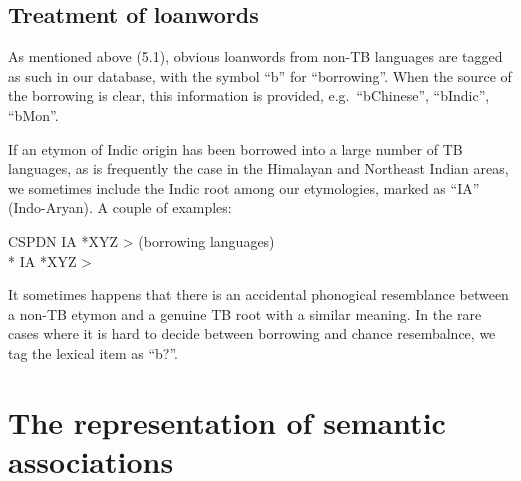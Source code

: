 


\subsection{Treatment of loanwords}

As mentioned above (5.1), obvious loanwords from non-TB languages are tagged as such in our database, with the symbol “b” for “borrowing”. When the source of the borrowing is clear, this information is provided, e.g.\ “bChinese”, “bIndic”, “bMon”.

If an etymon of Indic origin has been borrowed into a large number of TB languages, as is frequently the case in the Himalayan and Northeast Indian areas, we sometimes include the Indic root among our etymologies, marked as “IA” (Indo-Aryan).
A couple of examples:

CSPDN
IA *XYZ	> (borrowing languages) \\*
IA *XYZ	>

It sometimes happens that there is an accidental phonogical resemblance between a non-TB etymon and a genuine TB root with a similar meaning. In the rare cases where it is hard to decide between borrowing and chance resembalnce, we tag the lexical item as “b?”.

\section{The representation of semantic associations}

